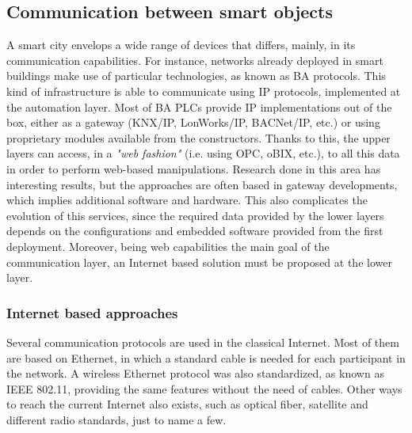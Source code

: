 \subsection{Communication between smart objects}
A smart city envelops a wide range of devices that differs, mainly, in its communication capabilities.
For instance, networks already deployed in smart buildings make use of particular technologies, as known as BA protocols.
This kind of infrastructure is able to communicate using IP protocols, implemented at the automation layer.
Most of BA PLCs provide IP implementations out of the box, either as a gateway (KNX/IP, LonWorks/IP, BACNet/IP, etc.)\cite{kastner2005commbas} or using proprietary modules available from the constructors.
Thanks to this, the upper layers can access, in a \textit{"web fashion"} (i.e. using OPC, oBIX, etc.)\cite{neugschwandtner2007knxtoobix}, to all this data in order to perform web-based manipulations.
Research done in this area has interesting results\cite{jung2013bainsmartcities}, but the approaches are often based in gateway developments, which implies additional software and hardware.
This also complicates the evolution of this services, since the required data provided by the lower layers depends on the configurations and embedded software provided from the first deployment.
Moreover, being web capabilities the main goal of the communication layer, an Internet based solution must be proposed at the lower layer.

\subsubsection{Internet based approaches}
Several communication protocols are used in the classical Internet.
Most of them are based on Ethernet\cite{ieee802.3}, in which a standard cable is needed for each participant in the network.
A wireless Ethernet protocol was also standardized, as known as IEEE 802.11\cite{ieee802.11}, providing the same features without the need of cables.
Other ways to reach the current Internet also exists, such as optical fiber, satellite and different radio standards, just to name a few.


